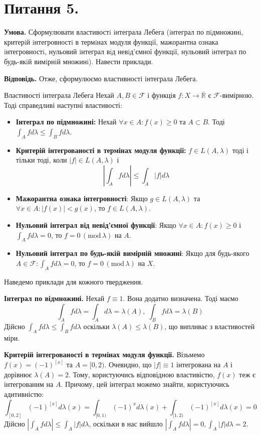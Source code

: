 \documentclass[14pt]{extarticle}
\begin{document}
\section*{Питання 5.}

\textbf{Умова.} Сформулювати властивостi iнтеграла Лебега (iнтеграл по пiдмножинi, критерiй iнтегровностi в термiнах модуля функцiї, мажорантна ознака iнтегровностi, нульовий iнтеграл вiд невiд’ємної функцiї, нульовий iнтеграл по будь-якiй вимiрнiй множинi). Навести приклади.

\textbf{Відповідь.} Отже, сформулюємо властивності інтеграла Лебега.

\begin{statement*}{Властивості інтеграла Лебега}
    Нехай $A,B \in \mathcal{F}$ і функція $f:X \to \overline{\mathbb{R}}$ є $\mathcal{F}$-вимірною. Тоді справедливі наступні властивості:
    \begin{itemize}
        \item \textbf{Інтеграл по підмножині:} Нехай $\forall x \in A: f(x) \geq 0$ та $A \subset B$. Тоді $\int_A fd\lambda \leq \int_B fd\lambda$.
        \item \textbf{Критерій інтегрованості в термінах модуля функції:} $f \in L(A,\lambda)$ тоді і тільки тоді, коли $|f| \in L(A,\lambda)$ і
        \[
        \left|\int_A fd\lambda\right| \leq \int_A |f|d\lambda
        \]
        \item \textbf{Мажорантна ознака інтегровності}: Якщо $g \in L(A,\lambda)$ та $\forall x \in A: |f(x)| < g(x)$, то $f \in L(A,\lambda)$.
        \item \textbf{Нульовий інтеграл від невід'ємної функції}: Якщо $\forall x \in A: f(x) \geq 0$ і $\int_A fd\lambda=0$, то $f=0 \, (\text{mod} \, \lambda)$ на $A$.
        \item \textbf{Нульовий інтеграл по будь-якій вимірній множині}: Якщо для будь-якого $A \in \mathcal{F}: \int_A fd\lambda=0$, то $f = 0 \, (\text{mod} \, \lambda)$ на $X$.
    \end{itemize}
\end{statement*}

Наведемо приклади для кожного твердження.

\textbf{Інтеграл по відмножині.} Нехай $f \equiv 1$. Вона додатно визначена. Тоді маємо
\[
\int_A fd\lambda = \int_A d\lambda = \lambda(A), \; \int_B fd\lambda = \lambda(B)
\]
Дійсно $\int_A fd\lambda \leq \int_B fd\lambda$ оскільки $\lambda(A) \leq \lambda(B)$, що випливає з властивостей міри. 

\textbf{Критерій інтегрованості в термінах модуля функції.} Візьмемо $f(x)=(-1)^{[x]}$ та $A = [0, 2)$. Очевидно, що $|f| \equiv 1$ інтегрована на $A$ і дорівнює $\lambda(A)=2$. Тому, користуючись відповідною властивістю, $f(x)$ теж є інтегрованим на $A$. Причому, цей інтеграл можемо знайти, користуючись адитивністю:
\[
\int_{[0,2]}(-1)^{[x]}d\lambda(x) = \int_{[0,1)}(-1)^xd\lambda(x) +\int_{[1,2)}(-1)^{[x]}d\lambda(x) = 0
\]
Дійсно $\left|\int_A fd\lambda\right| \leq \int_A |f|d\lambda$, оскільки в нас вийшло $\left|\int_A fd\lambda\right|=0,\int_A |f|d\lambda=2$. 
\end{document}

